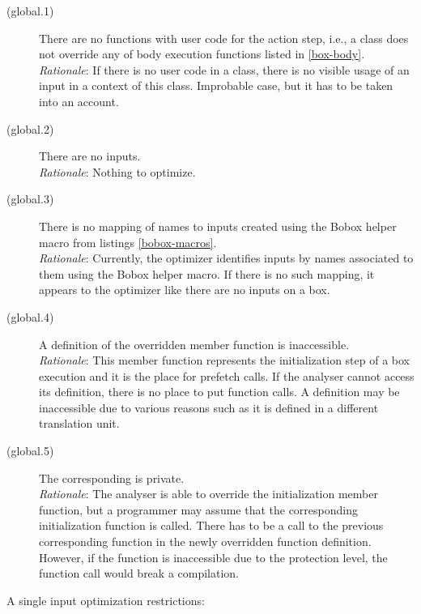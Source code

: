 \begin{description}
\item[(global.1)]{There are no functions with user code for the action step, i.e., a class does not override any of body execution functions listed in \ref{box-body}.\\
\emph{Rationale}: If there is no user code in a class, there is no visible usage of an input in a context of this class. Improbable case, but it has to be taken into an account.
}

\item[(global.2)]{There are no inputs.\\
\emph{Rationale}: Nothing to optimize. 
}

\item[(global.3)]{There is no mapping of names to inputs created using the Bobox helper macro from listings \ref{bobox-macros}.\\
\emph{Rationale}: Currently, the optimizer identifies inputs by names associated to them using the Bobox helper macro. If there is no such mapping, it appears to the optimizer like there are no inputs on a box.
}

\item[(global.4)]{A definition of the overridden  member function is inaccessible.\\
\emph{Rationale}: This member function represents the initialization step of a box execution and it is the place for prefetch calls. If the analyser cannot access its definition, there is no place to put function calls. A definition may be inaccessible due to various reasons such as it is defined in a different translation unit.
}

\item[(global.5)]{The corresponding  is private.\\
\emph{Rationale}: The analyser is able to override the initialization member function, but a programmer may assume that the corresponding initialization function is called. There has to be a call to the previous corresponding function in the newly overridden function definition. However, if the function is inaccessible due to the protection level, the function call would break a compilation.
}
\end{description}

A single input optimization restrictions:

